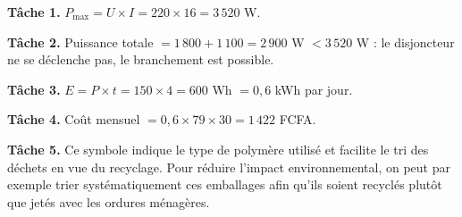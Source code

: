 \textbf{Tâche 1.} $P_{\max}=U\times I=220\times16=3\,520$ W.

\textbf{Tâche 2.} Puissance totale $=1\,800+1\,100=2\,900$ W $<3\,520$ W : le disjoncteur
ne se déclenche pas, le branchement est possible.

\textbf{Tâche 3.} $E=P\times t=150\times4=600$ Wh $=0{,}6$ kWh par jour.

\textbf{Tâche 4.} Coût mensuel $=0{,}6\times79\times30=1\,422$ FCFA.

\textbf{Tâche 5.} Ce symbole indique le type de polymère utilisé et facilite le tri des
déchets en vue du recyclage. Pour réduire l'impact environnemental, on peut par exemple
trier systématiquement ces emballages afin qu'ils soient recyclés plutôt que jetés avec
les ordures ménagères.
